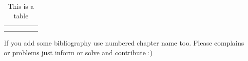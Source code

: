 \documentclass[11pt]{report}
\begin{document}
\begin{table}[h]
	\centering
	\begin{tabular}{|c|c|c|c|c|}
		\hline  &  &  &  &  \\ 
		\hline  &  &  &  &  \\ 
		\hline  &  &  &  &  \\ 
		\hline 
	\end{tabular} 
	\caption{This is a table}
\end{table}


If you add some bibliography use numbered chapter name too. Please complains or problems just inform or solve and contribute :)
\end{document}
